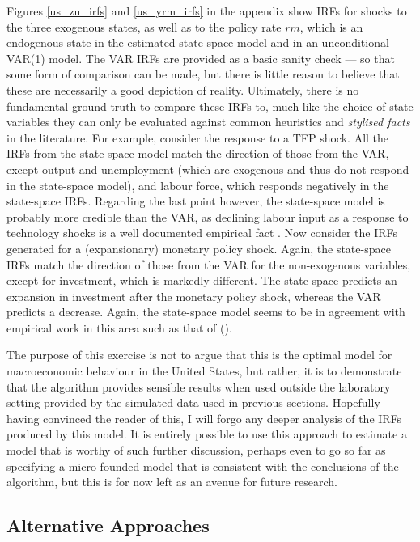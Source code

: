 \documentclass{article}
\begin{document}
Figures \ref{us_zu_irfs} and \ref{us_yrm_irfs} in the appendix show IRFs for shocks to the three exogenous states, as well as to the policy rate $rm$, which is an endogenous state in the estimated state-space model and in an unconditional VAR(1) model. The VAR IRFs are provided as a basic sanity check --- so that some form of comparison can be made, but there is little reason to believe that these are necessarily a good depiction of reality. Ultimately, there is no fundamental ground-truth to compare these IRFs to, much like the choice of state variables they can only be evaluated against common heuristics and \textit{stylised facts} in the literature. For example, consider the response to a TFP shock. All the IRFs from the state-space model match the direction of those from the VAR, except output and unemployment (which are exogenous and thus do not respond in the state-space model), and labour force, which responds negatively in the state-space IRFs. Regarding the last point however, the state-space model is probably more credible than the VAR, as declining labour input as a response to technology shocks is a well documented empirical fact \parencite{gali2004technology}. Now consider the IRFs generated for a (expansionary) monetary policy shock. Again, the state-space IRFs match the direction of those from the VAR for the non-exogenous variables, except for investment, which is markedly different. The state-space predicts an expansion in investment after the monetary policy shock, whereas the VAR predicts a decrease. Again, the state-space model seems to be in agreement with empirical work in this area such as that of \citeauthor{christiano2005nominal} (\citeyear{christiano2005nominal}).

The purpose of this exercise is not to argue that this is the optimal model for macroeconomic behaviour in the United States, but rather, it is to demonstrate that the algorithm provides sensible results when used outside the laboratory setting provided by the simulated data used in previous sections. Hopefully having convinced the reader of this, I will forgo any deeper analysis of the IRFs produced by this model. It is entirely possible to use this approach to estimate a model that is worthy of such further discussion, perhaps even to go so far as specifying a micro-founded model that is consistent with the conclusions of the algorithm, but this is for now left as an avenue for future research.

\subsection{Alternative Approaches}
\end{document}
